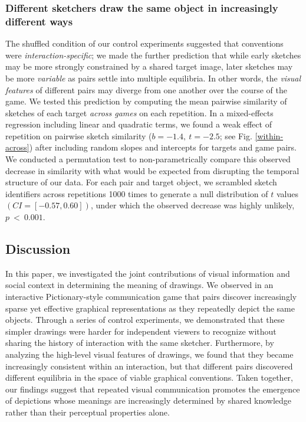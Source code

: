 \documentclass[10pt,letterpaper]{article}
\newcommand{\red}[1]{\textcolor{Red}{#1}}
\begin{document}
\subsubsection{Different sketchers draw the same object in increasingly different ways} 

The shuffled condition of our control experiments suggested that conventions were \emph{interaction-specific}; we made the further prediction that while early sketches may be more strongly constrained by a shared target image, later sketches may be more \emph{variable} as pairs settle into multiple equilibria.
In other words, the \emph{visual features} of different pairs may diverge from one another over the course of the game.
We tested this prediction by computing the mean pairwise similarity of sketches of each target \emph{across games} on each repetition. 
In a mixed-effects regression including linear and quadratic terms, we found a weak effect of repetition on pairwise sketch similarity ($b = -1.4, ~t = -2.5$; see Fig. \ref{within-across})  after including random slopes and intercepts for targets and game pairs. %
We conducted a permutation test to non-parametrically compare this observed decrease in similarity with what would be expected from disrupting the temporal structure of our data.
For each pair and target object, we scrambled sketch identifiers across repetitions 1000 times to generate a null distribution of $t$ values $(CI = [-0.57, 0.60])$, under which the observed decrease was highly unlikely,~$p~<~0.001$.



\subsection{Discussion}

In this paper, we investigated the joint contributions of visual information and social context in determining the meaning of drawings.
We observed in an interactive Pictionary-style communication game that pairs discover increasingly sparse yet effective graphical representations as they repeatedly depict the same objects.
Through a series of control experiments, we demonstrated that these simpler drawings were harder for independent viewers to recognize without sharing the history of interaction with the same sketcher.
Furthermore, by analyzing the high-level visual features of drawings, we found that they became increasingly consistent within an interaction, but that different pairs discovered different equilibria in the space of viable graphical conventions. 
Taken together, our findings suggest that repeated visual communication promotes the emergence of depictions whose meanings are increasingly determined by shared knowledge rather than their perceptual properties alone.
\end{document}
